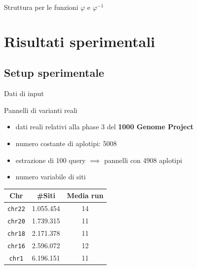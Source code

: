 \documentclass[]{beamer}
\def\rank{\mbox{\rm {\sf rank}}}
\def\PBWT{\mbox{\rm {\sf PBWT}}}
\def\RLPBWT{\mbox{\rm {\sf RLPBWT}}}
\def\Cplusplus{C\raisebox{0.5ex}{\tiny\textbf{++}}}
\begin{document}
\begin{frame}{Struttura per le funzioni $\varphi$ e $\varphi^{-1}$}
\begin{figure}[H]
  \end{figure}
  
\end{frame}
\section{Risultati sperimentali}
\subsection{Setup sperimentale}
\begin{frame}{Dati di input}
  \begin{block}{Pannelli di varianti reali}
    \begin{itemize}
      \item dati reali relativi alla phase 3 del \textbf{1000 Genome Project}
      \item numero costante di aplotipi: 5008
      \item estrazione di 100 query $\implies$ pannelli con 4908 aplotipi
      \item numero variabile di siti
    \end{itemize}
  \end{block}
  \begin{table}[H]
    \centering
    \begin{tabular}{c||c|c}
      \textbf{Chr} & \textbf{\#Siti} & \textbf{Media run} \\ 
      \hline
      \texttt{chr22} & 1.055.454 & 14\\
      \texttt{chr20} & 1.739.315 & 11\\
      \texttt{chr18} & 2.171.378 & 11\\
      \texttt{chr16} & 2.596.072 & 12\\
      \texttt{chr1} & 6.196.151 & 11\\
    \end{tabular}
  \end{table}
\end{frame}
\end{document}
